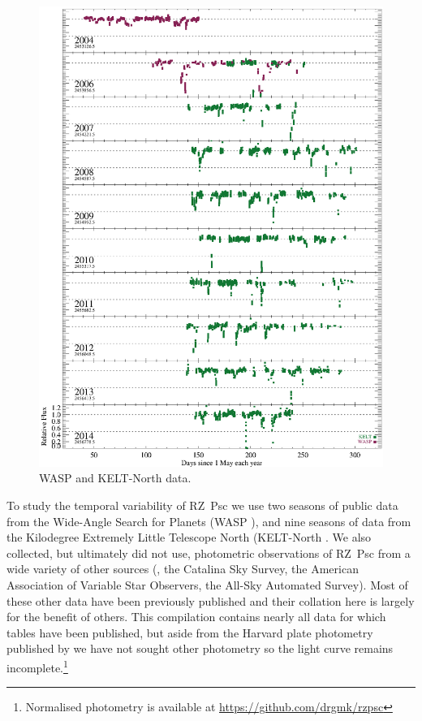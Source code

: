 \documentclass[]{rsos}
\begin{document}
\begin{figure}
  \begin{center}
    \hspace{-0.5cm} \includegraphics[width=\textwidth]{figs/yearly-2004.eps}
    \caption{WASP and KELT-North data.}\label{fig:waspkelt}
  \end{center}
\end{figure}

To study the temporal variability of RZ~Psc we use two seasons of public data from the
Wide-Angle Search for Planets (WASP \cite{2006PASP..118.1407P}), and nine seasons of data
from the Kilodegree Extremely Little Telescope North (KELT-North
\cite{2007PASP..119..923P}. We also collected, but ultimately did not use, photometric
observations of RZ~Psc from a wide variety of other sources
(\cite{1994AJ....108.1906H,1973IBVS..783....1K,1980PZ.....21..310K,1985PZ.....22..181Z,1991Afz....34..333K,1997AcA....47..467P,2014Ap.....57..491P},
the Catalina Sky Survey, the American Association of Variable Star Observers, the All-Sky
Automated Survey). Most of these other data have been previously published and their
collation here is largely for the benefit of others. This compilation contains nearly all
data for which tables have been published, but aside from the Harvard plate photometry
published by \cite{1999A&AS..140..293G} we have not sought other photometry so the light
curve remains incomplete.\footnote{Normalised photometry is available at
  \href{https://github.com/drgmk/rzpsc}{https://github.com/drgmk/rzpsc}}
\end{document}
